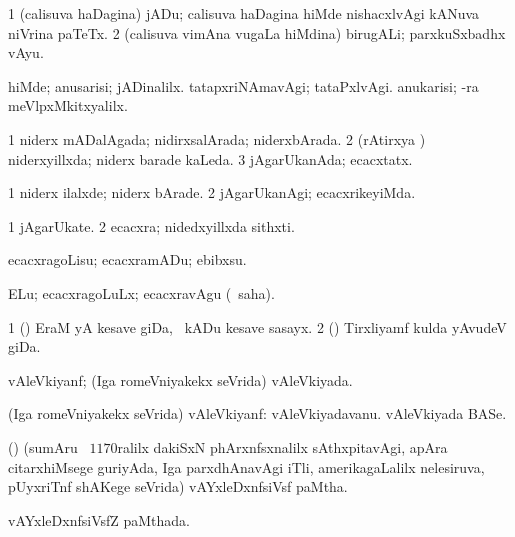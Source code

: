 {\bentry
{} 
\gl{\nA}
\expl{}
\bmng
\bnum
\num{1} (calisuva haDagina) jADu; calisuva haDagina hiMde nishacxlvAgi kANuva niVrina paTeTx. 
\num{2} (calisuva vimAna \mo vugaLa hiMdina) birugALi; parxkuSxbadhx vAyu. 
\enum
\emng

\noindent 
\gl{\pagu}
\expl{}
\bmng
{} 
\banum
{} hiMde; anusarisi; jADinalilx. 
 tatapxriNAmavAgi; tataPxlvAgi. 
 anukarisi; -ra meVlpxMkitxyalilx. 
\eanum
\emng
\eentry

\bentry
{}
  \gl{\gu}
\expl{}
\bmng
\bnum
\num{1} niderx mADalAgada; nidirxsalArada; niderxbArada. 
\num{2} (rAtirxya \vi) niderxyillxda; niderx barade kaLeda. 
\num{3} jAgarUkanAda; ecacxtatx. 
\enum
\emng
\eentry

\bentry
{} 
\gl{\kirxvi}
\expl{}
\bmng
\bnum
\num{1} niderx ilalxde; niderx bArade. 
\num{2} jAgarUkanAgi; ecacxrikeyiMda. 
\enum
\emng
\eentry

\bentry
{} 
\gl{\nA}
\expl{}
\bmng
\bnum
\num{1} jAgarUkate. 
\num{2} ecacxra; nidedxyillxda sithxti. 
\enum
\emng
\eentry

\bentry
{} 
\gl{\akirx}
\expl{}
\bmng
ecacxragoLisu; ecacxramADu; ebibxsu. 
\emng

\noindent 
\gl{\akirx}
\expl{}
\bmng
ELu; ecacxragoLuLx; ecacxravAgu (\rUpa\ saha). 
\emng
\eentry

\bentry
{} 
\gl{\nA}
\expl{}
\bmng
\bnum
\num{1} (\birx) EraM yA kesave giDa, \kanmu\ kADu kesave sasayx. 
\num{2} (\ame) Tirxliyamf kulda yAvudeV giDa. 
\enum
\emng
\eentry

\bentry
{} 
\gl{\gu}
\expl{}
\bmng
vAleVkiyanf; (Iga romeVniyakekx seVrida) vAleVkiyada. 
\emng
\eentry

\bentry
{} 
\gl{\nA}
\expl{}
\bmng
(Iga romeVniyakekx seVrida) vAleVkiyanf: 
\banum
{} vAleVkiyadavanu. 
 vAleVkiyada BASe. 
\eanum
\emng
\eentry

\bentry
{} 
\gl{\nA}
\expl{}
\bmng
(\bava) (sumAru \kirxsha\ $1170$ralilx dakiSxN phArxnfsxnalilx sAthxpitavAgi, apAra citarxhiMsege guriyAda, Iga parxdhAnavAgi iTli, amerikagaLalilx nelesiruva, pUyxriTnf shAKege seVrida) vAYxleDxnfsiVsf paMtha. 
\emng
\eentry

\bentry
{} 
\gl{\gu}
\expl{}
\bmng
vAYxleDxnfsiVsfZ paMthada. 
\emng
\eentry

}
